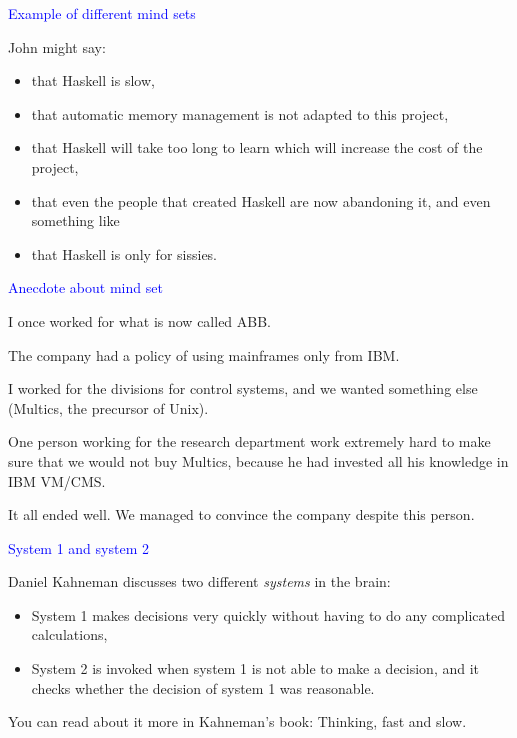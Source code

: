 \documentclass{slides}
\newcommand{\ti}[1]{\begin{center}\Large{\textcolor{blue}{#1}}\end{center}}
\begin{document}
\begin{slide}\ti{Example of different mind sets}

John might say:
\begin{itemize}
\item that Haskell is slow,
\item that automatic memory management is not adapted to this project,
\item that Haskell will take too long to learn which will increase the
  cost of the project,
\item that even the people that created Haskell are now abandoning it,
  and even something like
\item that Haskell is only for sissies.
\end{itemize}

\vfill\end{slide}
\begin{slide}\ti{Anecdote about mind set}

I once worked for what is now called ABB.

The company had a policy of using mainframes only from IBM.

I worked for the divisions for control systems, and we wanted
something else (Multics, the precursor of Unix).

One person working for the research department work extremely hard to
make sure that we would not buy Multics, because he had invested all
his knowledge in IBM VM/CMS.

It all ended well.  We managed to convince the company despite this
person.

\vfill\end{slide}
\begin{slide}\ti{System 1 and system 2}

Daniel Kahneman discusses two different \emph{systems} in the brain:

\begin{itemize}
\item System 1 makes decisions very quickly without having to do any
  complicated calculations,
\item System 2 is invoked when system 1 is not able to make a
  decision, and it checks whether the decision of system 1 was
  reasonable.
\end{itemize}

You can read about it more in Kahneman's book: Thinking, fast and
slow.

\vfill\end{slide}
\end{document}
